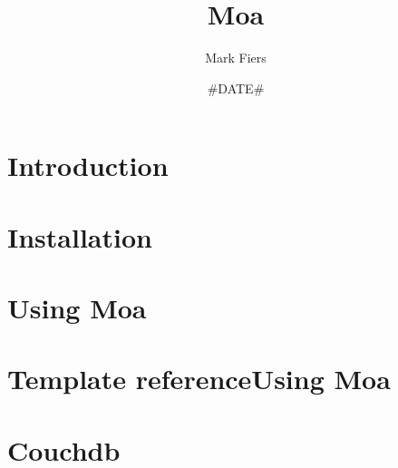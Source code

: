 \documentclass[a4paper,11pt,oneside]{report}
\begin{document}

\title{Moa}
\author{Mark Fiers}
\date{#DATE#}

\begin{titlepage}
\vfill
{}
\vfill
\vfill
{}
\end{titlepage}
\tableofcontents

\chapter{Introduction\label{ch:introduction}}

\chapter{Installation\label{ch:installation}}

\chapter{Using Moa\label{ch:using}}

\chapter{Template referenceUsing Moa\label{ch:templates}}

\chapter{Couchdb\label{ch:couchdb}}




\end{document}
